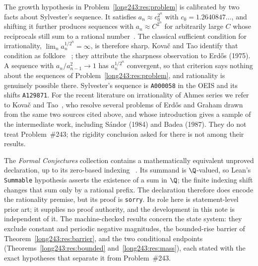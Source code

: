 \documentclass[11pt]{article}
\begin{document}
The growth hypothesis in Problem~\ref{long243:res:problem} is calibrated by two facts
about Sylvester's sequence.  It satisfies $a_n\approx c_0^{2^{n}}$ with
$c_0=1.2640847\ldots$, and shifting it further produces sequences with
$a_n\approx C^{2^{n}}$ for arbitrarily large $C$ whose reciprocals still sum
to a rational number~\cite[arXiv v4, p.~2]{kovactao2024}.  The classical sufficient
condition for irrationality, $\lim_n a_n^{1/2^{n}}=\infty$, is therefore
sharp.  Kova\v{c} and Tao identify that condition as folklore
~\cite[arXiv v4, p.~2]{kovactao2024}; they attribute the sharpness observation to
Erd\H{o}s (1975).  A sequence with
$a_n/a_{n-1}^{2}\to1$ has $a_n^{1/2^{n}}$
convergent, so that criterion says nothing about the sequences of
Problem~\ref{long243:res:problem}, and rationality is genuinely possible there.
Sylvester's
sequence is \texttt{A000058} in the OEIS and its shifts \texttt{A129871}.  For
the recent literature on irrationality of Ahmes series we refer to Kova\v{c}
and Tao~\cite{kovactao2024}, who resolve several problems of Erd\H{o}s and
Graham drawn from the same two sources cited above, and whose introduction
gives a sample of the intermediate work, including S\'andor (1984) and Badea
(1987).  They do not treat Problem~\#243; the rigidity conclusion asked for
there is not among their results.

The \emph{Formal Conjectures} collection contains a mathematically equivalent
unproved declaration, up to its zero-based indexing
~\cite{formalconjectures243}.  Its summand is $\Q$-valued, so Lean's
\texttt{Summable} hypothesis asserts the existence of a sum in $\Q$; the
finite indexing shift changes that sum only by a rational prefix.  The
declaration therefore does encode the rationality premise, but its proof is
\texttt{sorry}.  Its role here is statement-level prior art; it supplies no
proof authority, and the development in this note is independent of it.
The machine-checked results concern the state system: they exclude constant and
periodic negative magnitudes, the bounded-rise barrier of
Theorem~\ref{long243:res:barrier}, and the two conditional endpoints
(Theorems~\ref{long243:res:bounded} and~\ref{long243:res:mass}), each stated with the exact
hypotheses that separate it from Problem~\#243.

\statusboundary
\end{document}

